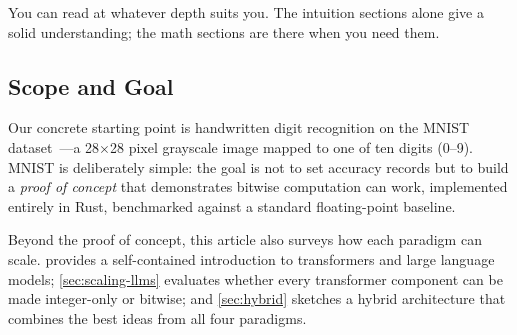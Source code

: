 You can read at whatever depth suits you. The intuition sections alone
give a solid understanding; the math sections are there when you need
them.

\subsection{Scope and Goal}

Our concrete starting point is handwritten digit recognition on the
MNIST dataset~\cite{lecun1998mnist}---a 28$\times$28 pixel grayscale
image mapped to one of ten digits (0--9). MNIST is deliberately simple:
the goal is not to set accuracy records but to build a \emph{proof of
concept} that demonstrates bitwise computation can work, implemented
entirely in Rust, benchmarked against a standard floating-point baseline.

Beyond the proof of concept, this article also surveys how each paradigm
can scale.  provides a self-contained
introduction to transformers and large language models;
\cref{sec:scaling-llms} evaluates whether every transformer component
can be made integer-only or bitwise; and \cref{sec:hybrid}
sketches a hybrid architecture that combines the best ideas from all
four paradigms.
